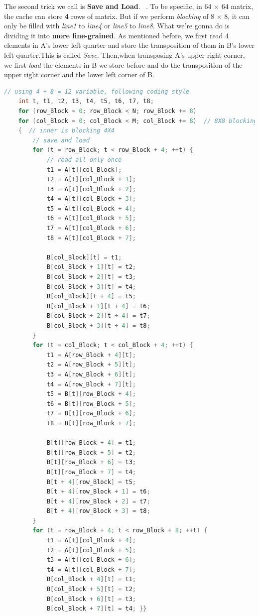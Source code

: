\documentclass{article}
\begin{document}
The second trick we call is \textbf{Save and Load}. ~\cite{zhihu}. To be specific, in 64 $\times$ 64 matrix, the cache can store \textbf{4} rows of matrix. But if we perform \textit{blocking} of 8 $\times$ 8, it can only be filled with \textit{line1} to \textit{line4} or \textit{line5} to \textit{line8}. What we're gonna do is dividing it into \textbf{more fine-grained}. As mentioned before, we first read 4 elements in A's lower left quarter and store the transposition of them in B's lower left quarter.This is called \textit{Save}. Then,when transposing A's upper right corner, we first \textit{load} the elements in B we store before and do the transposition of the upper right corner and the lower left corner of B. 

\begin{lstlisting}[language=c]
	// using 4 + 8 = 12 variable, following coding style
	int t, t1, t2, t3, t4, t5, t6, t7, t8;
	for (row_Block = 0; row_Block < N; row_Block += 8)
	for (col_Block = 0; col_Block < M; col_Block += 8)  // 8X8 blocking
	{  // inner is blocking 4X4
		// save and load
		for (t = row_Block; t < row_Block + 4; ++t) {
			// read all only once
			t1 = A[t][col_Block];
			t2 = A[t][col_Block + 1];
			t3 = A[t][col_Block + 2];
			t4 = A[t][col_Block + 3];
			t5 = A[t][col_Block + 4];
			t6 = A[t][col_Block + 5];
			t7 = A[t][col_Block + 6];
			t8 = A[t][col_Block + 7];
			
			B[col_Block][t] = t1;
			B[col_Block + 1][t] = t2;
			B[col_Block + 2][t] = t3;
			B[col_Block + 3][t] = t4;
			B[col_Block][t + 4] = t5;
			B[col_Block + 1][t + 4] = t6;
			B[col_Block + 2][t + 4] = t7;
			B[col_Block + 3][t + 4] = t8;
		}
		for (t = col_Block; t < col_Block + 4; ++t) {
			t1 = A[row_Block + 4][t];
			t2 = A[row_Block + 5][t];
			t3 = A[row_Block + 6][t];
			t4 = A[row_Block + 7][t];
			t5 = B[t][row_Block + 4];
			t6 = B[t][row_Block + 5];
			t7 = B[t][row_Block + 6];
			t8 = B[t][row_Block + 7];
			
			B[t][row_Block + 4] = t1;
			B[t][row_Block + 5] = t2;
			B[t][row_Block + 6] = t3;
			B[t][row_Block + 7] = t4;
			B[t + 4][row_Block] = t5;
			B[t + 4][row_Block + 1] = t6;
			B[t + 4][row_Block + 2] = t7;
			B[t + 4][row_Block + 3] = t8;
		}
		for (t = row_Block + 4; t < row_Block + 8; ++t) {
			t1 = A[t][col_Block + 4];
			t2 = A[t][col_Block + 5];
			t3 = A[t][col_Block + 6];
			t4 = A[t][col_Block + 7];
			B[col_Block + 4][t] = t1;
			B[col_Block + 5][t] = t2;
			B[col_Block + 6][t] = t3;
			B[col_Block + 7][t] = t4; }}
\end{lstlisting}
\end{document}
